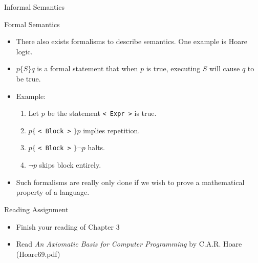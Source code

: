\documentclass[handout]{beamer}
\newenvironment{code}{%
 \VerbatimEnvironment
 \begin{adjustbox}{max width=\textwidth, max height=0.7\textheight}
 \begin{BVerbatim}
  }{
  \end{BVerbatim}
 \end{adjustbox}
}
\begin{document}
\begin{frame}[fragile]{Informal Semantics}
\end{frame}

\begin{frame}{Formal Semantics}
    \begin{itemize}
        \item There also exists formalisms to describe semantics. One example is Hoare logic.
        \item $p \{S\} q$ is a formal statement that when $p$ is true, executing $S$ will cause $q$ to be true.
        \item Example:
        \begin{enumerate}
            \item Let $p$ be the statement \texttt{< Expr >} is true.
            \item $p \{$ \texttt{< Block >} $\} p$ implies repetition.
            \item $p \{$ \texttt{< Block >} $\} \neg p$ halts.
            \item $\neg p$ skips block entirely.
        \end{enumerate}
        \item Such formalisms are really only done if we wish to prove a mathematical property of a language.
    \end{itemize}
\end{frame}

\begin{frame}{Reading Assignment}
    \begin{itemize}
        \item Finish your reading of Chapter 3
        \item Read \textit{An Axiomatic Basis for Computer Programming} by C.A.R. Hoare (Hoare69.pdf)
    \end{itemize}
\end{frame}
\end{document}
